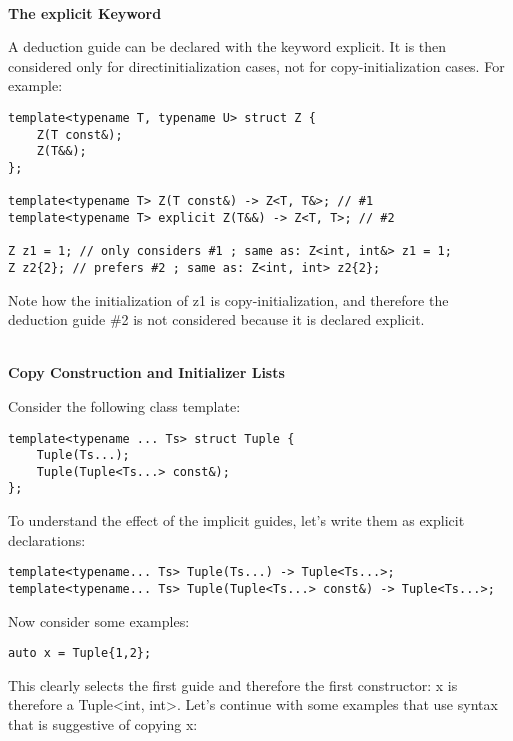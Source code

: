 \hspace*{\fill} \\ %
\noindent
\textbf{The explicit Keyword}

A deduction guide can be declared with the keyword explicit. It is then considered only for directinitialization cases, not for copy-initialization cases. For example:

\begin{lstlisting}[style=styleCXX]
template<typename T, typename U> struct Z {
	Z(T const&);
	Z(T&&);
};

template<typename T> Z(T const&) -> Z<T, T&>; // #1
template<typename T> explicit Z(T&&) -> Z<T, T>; // #2

Z z1 = 1; // only considers #1 ; same as: Z<int, int&> z1 = 1;
Z z2{2}; // prefers #2 ; same as: Z<int, int> z2{2};
\end{lstlisting}

Note how the initialization of z1 is copy-initialization, and therefore the deduction guide \#2 is not considered because it is declared explicit.

\hspace*{\fill} \\ %
\noindent
\textbf{Copy Construction and Initializer Lists}

Consider the following class template:

\begin{lstlisting}[style=styleCXX]
template<typename ... Ts> struct Tuple {
	Tuple(Ts...);
	Tuple(Tuple<Ts...> const&);
};
\end{lstlisting}

To understand the effect of the implicit guides, let’s write them as explicit declarations:

\begin{lstlisting}[style=styleCXX]
template<typename... Ts> Tuple(Ts...) -> Tuple<Ts...>;
template<typename... Ts> Tuple(Tuple<Ts...> const&) -> Tuple<Ts...>;
\end{lstlisting}

Now consider some examples:

\begin{lstlisting}[style=styleCXX]
auto x = Tuple{1,2};
\end{lstlisting}

This clearly selects the first guide and therefore the first constructor: x is therefore a Tuple<int, int>. Let’s continue with some examples that use syntax that is suggestive of copying x:


